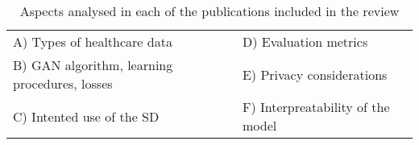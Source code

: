 \begin{table}
\centering
  \caption{Aspects analysed in each of the publications included in the review\label{tab:themes}}
  \begin{tabular}{ll}\toprule
  A) Types of healthcare data & D) Evaluation metrics\\
  B) GAN algorithm, learning procedures, losses & E) Privacy considerations\\
  C) Intented use of the SD & F) Interpreatability of the model\\\bottomrule
  \end{tabular}
\end{table}